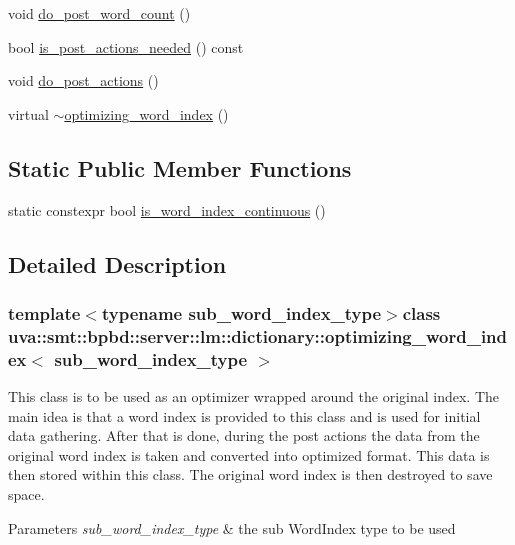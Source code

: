 \begin{DoxyCompactItemize}
\item 
void \hyperlink{classuva_1_1smt_1_1bpbd_1_1server_1_1lm_1_1dictionary_1_1optimizing__word__index_ab6f896a4de83ae4f4d15d1ffaabf65c7}{do\+\_\+post\+\_\+word\+\_\+count} ()
\item 
bool \hyperlink{classuva_1_1smt_1_1bpbd_1_1server_1_1lm_1_1dictionary_1_1optimizing__word__index_aacae85b7f0c4f5fc8a4835e994da6475}{is\+\_\+post\+\_\+actions\+\_\+needed} () const 
\item 
void \hyperlink{classuva_1_1smt_1_1bpbd_1_1server_1_1lm_1_1dictionary_1_1optimizing__word__index_ad0895972517a24928707dcf8cbef095e}{do\+\_\+post\+\_\+actions} ()
\item 
virtual \hyperlink{classuva_1_1smt_1_1bpbd_1_1server_1_1lm_1_1dictionary_1_1optimizing__word__index_a51f16a374a173acd644d9371b22cfcd5}{$\sim$optimizing\+\_\+word\+\_\+index} ()
\end{DoxyCompactItemize}
\subsection*{Static Public Member Functions}
\begin{DoxyCompactItemize}
\item 
static constexpr bool \hyperlink{classuva_1_1smt_1_1bpbd_1_1server_1_1lm_1_1dictionary_1_1optimizing__word__index_a239f20319b722909e3cd9d623663c2df}{is\+\_\+word\+\_\+index\+\_\+continuous} ()
\end{DoxyCompactItemize}


\subsection{Detailed Description}
\subsubsection*{template$<$typename sub\+\_\+word\+\_\+index\+\_\+type$>$class uva\+::smt\+::bpbd\+::server\+::lm\+::dictionary\+::optimizing\+\_\+word\+\_\+index$<$ sub\+\_\+word\+\_\+index\+\_\+type $>$}

This class is to be used as an optimizer wrapped around the original index. The main idea is that a word index is provided to this class and is used for initial data gathering. After that is done, during the post actions the data from the original word index is taken and converted into optimized format. This data is then stored within this class. The original word index is then destroyed to save space. 
\begin{DoxyParams}{Parameters}
{\em sub\+\_\+word\+\_\+index\+\_\+type} & the sub Word\+Index type to be used \\
\hline
\end{DoxyParams}


